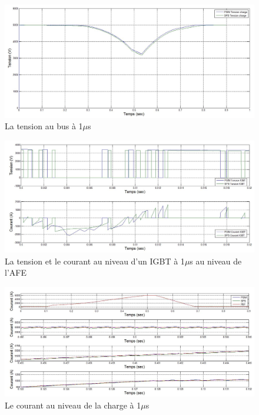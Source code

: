 \documentclass[11pt,letterpaper,final]{report}
\begin{document}
\begin{figure}[htb]
\centering
\includegraphics[scale=0.5]{Fig/Hach_AFE/1u/ten_bus.jpg}
\caption{La tension au bus à 1$\mu$s}
\label{AF_HA_vch1}
\end{figure}


\begin{figure}[htb]
\centering
\includegraphics[scale=0.5]{Fig/Hach_AFE/1u/IGBT_AFE.jpg}
\caption{La tension et le courant au niveau d'un IGBT à 1$\mu$s au niveau de l'AFE}
\label{AF_HA_IGBT1}
\end{figure}

\begin{figure}[htb]
\centering
\includegraphics[scale=0.5]{Fig/Hach_AFE/1u/hach_cou_ch.jpg}
\caption{Le courant au niveau de la charge à 1$\mu$s}
\label{AF_HA_CHA1}
\end{figure}
\end{document}
